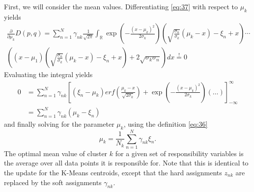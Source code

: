First, we will consider the mean values.
Differentiating \eqref{eq:37} with respect to $\mu_k$ yields
\begin{multline}
  \label{eq:39}
  \frac{\partial }{\partial\mu_k}D(p,q) = \sum_{n=1}^N\gamma_{nk}\frac{1}{\sqrt{2\pi}}\int_\mathbb{R}\exp\left(-\frac{(x-\mu_k)^2}{2\sigma_k}\right)\left(\sqrt{\frac{\sigma_n}{\sigma_k}}(\mu_k-x)-\xi_n+x\right)\cdots\\ \left((x-\mu_1)\left(\sqrt{\frac{\sigma_n}{\sigma_k}}(\mu_k-x)-\xi_n+x\right)+2\sqrt{\sigma_k\sigma_n}\right)dx \overset{!}{=} 0
\end{multline}
Evaluating the integral  yields
\begin{align}
  \label{eq:40}
 0 &=\sum_{n=1}^N\gamma_{nk}\left[(\xi_n-\mu_k)erf\left(\frac{\mu_k-x}{\sqrt{2\sigma_k}}\right) + \exp\left(-\frac{(x-\mu_k)^2}{2\sigma_k}\right)\left(\ldots\right)\right]_{-\infty}^\infty\\
 &=\sum_{n=1}^N\gamma_{nk}(\mu_k-\xi_n)
\end{align}
and finally solving for the parameter $\mu_k$, using the definition \eqref{eq:36}
\begin{equation}
  \label{eq:41}
  \mu_k = \frac{1}{N_k}\sum_{n=1}^N\gamma_{nk}\xi_n.
\end{equation}
The optimal mean value of cluster $k$ for a given set of responsibility variables is the average over all data points it is responsible for.
Note that this is identical to the update for the K-Means centroids, except that the hard assignments $z_{nk}$ are replaced by the soft assignments $\gamma_{nk}$.

